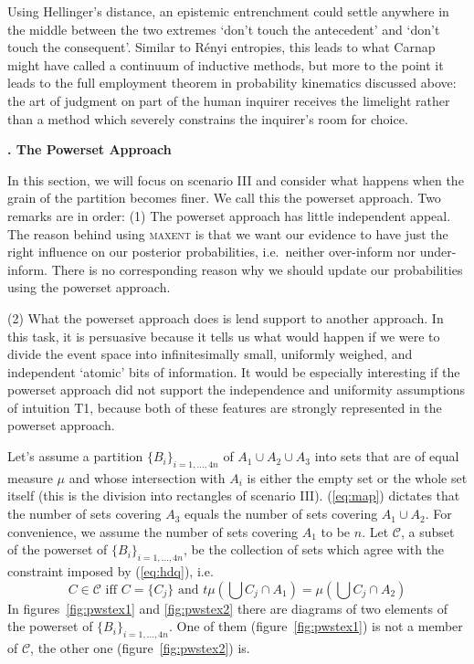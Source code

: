 \documentclass[12pt]{article}
\newcommand{\kapt}[1]{\textbf{{\thechap}. #1}\addtocounter{chap}{1}}
\newcommand{\qnull}[1]{`#1'}
\begin{document}
Using Hellinger's distance, an epistemic entrenchment could settle
anywhere in the middle between the two extremes \qnull{don't touch
  the antecedent} and \qnull{don't touch the consequent}. Similar
to R{\'e}nyi entropies, this leads to what Carnap might have
called a continuum of inductive methods, but more to the point it
leads to the full employment theorem in probability kinematics
discussed above: the art of judgment on part of the human inquirer
receives the limelight rather than a method which severely
constrains the inquirer's room for choice.

\kapt{The Powerset Approach}

In this section, we will focus on scenario III and consider what
happens when the grain of the partition becomes finer. We call
this the powerset approach. Two remarks are in order: (1) The
powerset approach has little independent appeal. The reason behind
using \textsc{maxent} is that we want our evidence to have just
the right influence on our posterior probabilities, i.e.\ neither
over-inform nor under-inform. There is no corresponding reason why
we should update our probabilities using the powerset approach.

(2) What the powerset approach does is lend support to another
approach. In this task, it is persuasive because it tells us what
would happen if we were to divide the event space into infinitesimally
small, uniformly weighed, and independent \qnull{atomic} bits of
information. It would be especially interesting if the powerset
approach did not support the independence and uniformity assumptions
of intuition T1, because both of these features are strongly
represented in the powerset approach.

Let's assume a partition $\{B_{i}\}_{i=1,{\ldots},4n}$ of
$A_{1}\cup{}A_{2}\cup{}A_{3}$ into sets that are of equal measure
$\mu$ and whose intersection with $A_{i}$ is either the empty set or
the whole set itself (this is the division into rectangles of scenario
III). ({\ref{eq:map}}) dictates that the number of sets covering $A_{3}$ equals
the number of sets covering $A_{1}\cup{}A_{2}$. For convenience, we
assume the number of sets covering $A_{1}$ to be $n$. Let
$\mathcal{C}$, a subset of the powerset of
$\{B_{i}\}_{i=1,{\ldots},4n}$, be the collection of sets which agree
with the constraint imposed by ({\ref{eq:hdq}}), i.e.\
\begin{displaymath}
  C\in\mathcal{C}\mbox{ iff }C=\{C_{j}\}\mbox{ and }t\mu\left(\bigcup{}C_{j}\cap{}A_{1}\right)=\mu\left(\bigcup{}C_{j}\cap{}A_{2}\right)
\end{displaymath}
In figures~\ref{fig:pwstex1} and \ref{fig:pwstex2} there are diagrams
of two elements of the powerset of $\{B_{i}\}_{i=1,{\ldots},4n}$. One
of them (figure~\ref{fig:pwstex1}) is not a member of $\mathcal{C}$,
the other one (figure~\ref{fig:pwstex2}) is. 
\end{document}
